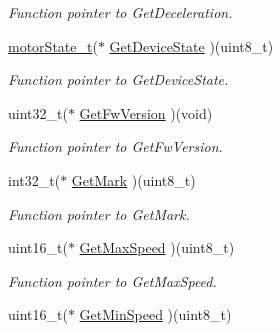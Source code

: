 \begin{DoxyCompactItemize}
\begin{DoxyCompactList}\small\item\em Function pointer to Get\+Deceleration. \end{DoxyCompactList}\item 
\mbox{\label{structmotor_drv__t_aa035813a35bb5a589891b6879c88f5cf}} 
\mbox{\hyperlink{group___device___states_ga9ba865be7705688e94f95a410e917a07}{motor\+State\+\_\+t}}($\ast$ \mbox{\hyperlink{structmotor_drv__t_aa035813a35bb5a589891b6879c88f5cf}{Get\+Device\+State}} )(uint8\+\_\+t)
\begin{DoxyCompactList}\small\item\em Function pointer to Get\+Device\+State. \end{DoxyCompactList}\item 
\mbox{\label{structmotor_drv__t_aaa6c85b99a40f6ebb4bc22647afd814e}} 
uint32\+\_\+t($\ast$ \mbox{\hyperlink{structmotor_drv__t_aaa6c85b99a40f6ebb4bc22647afd814e}{Get\+Fw\+Version}} )(void)
\begin{DoxyCompactList}\small\item\em Function pointer to Get\+Fw\+Version. \end{DoxyCompactList}\item 
\mbox{\label{structmotor_drv__t_ab8d2a9b8286ea9781035e30e887264a6}} 
int32\+\_\+t($\ast$ \mbox{\hyperlink{structmotor_drv__t_ab8d2a9b8286ea9781035e30e887264a6}{Get\+Mark}} )(uint8\+\_\+t)
\begin{DoxyCompactList}\small\item\em Function pointer to Get\+Mark. \end{DoxyCompactList}\item 
\mbox{\label{structmotor_drv__t_aa34c04b174fdaf1e53e6796ffb7b9c7b}} 
uint16\+\_\+t($\ast$ \mbox{\hyperlink{structmotor_drv__t_aa34c04b174fdaf1e53e6796ffb7b9c7b}{Get\+Max\+Speed}} )(uint8\+\_\+t)
\begin{DoxyCompactList}\small\item\em Function pointer to Get\+Max\+Speed. \end{DoxyCompactList}\item 
\mbox{\label{structmotor_drv__t_a93c3923b625321220442f8175daf39aa}} 
uint16\+\_\+t($\ast$ \mbox{\hyperlink{structmotor_drv__t_a93c3923b625321220442f8175daf39aa}{Get\+Min\+Speed}} )(uint8\+\_\+t)

\end{DoxyCompactItemize}
